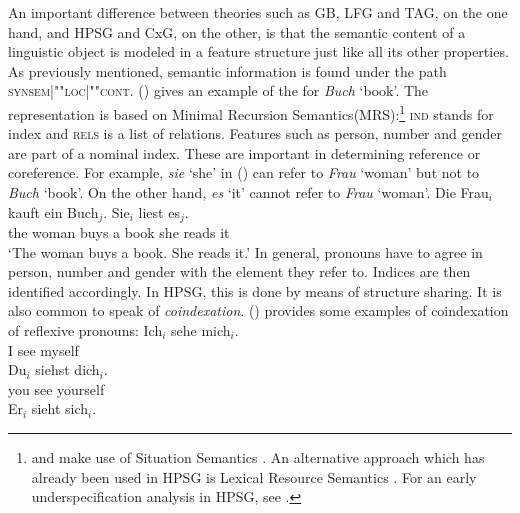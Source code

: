 An important difference between theories such as GB, LFG and TAG, on the one hand, and HPSG and CxG, on the other, is that the semantic content of a linguistic
object is modeled in a feature structure just like all its other properties. As previously mentioned, semantic information is found under the path
\textsc{synsem|""loc|""cont}. () gives an example of the \contv for \emph{Buch} `book'. The
representation is based on Minimal Recursion Semantics\indexmrs (MRS):\footnote{%
   \citet{ps2} and \citet{GSag2000a-u} make use of Situation Semantics \citep*{BP83a,CMP90,Devlin92}\nocite{BP87a}.
   An alternative approach which has already been used in HPSG is Lexical Resource Semantics \citep{RS2004a-u}.
   For an early underspecification analysis in HPSG, see .
}
\ea
\label{le-buch}
\z
\textsc{ind} stands for index and \textsc{rels} is a list of relations. Features such as person, number and
gender are part of a nominal index. These are important
in determining reference or coreference.
For example, \emph{sie} `she' in () can refer to \emph{Frau} `woman' but not to \emph{Buch} `book'. On the other hand, \emph{es} 
`it' cannot refer to \emph{Frau} `woman'.
\ea
\gll Die Frau$_i$ kauft ein Buch$_j$. Sie$_i$ liest es$_j$.\\
	 the woman buys a book she reads it\\
\glt `The woman buys a book. She reads it.'
\z
In general, pronouns have to agree in person, number and gender with the element they refer to. Indices are then identified accordingly.
In HPSG, this is done by means of structure sharing. It is also common to speak of \textit{coindexation}.
() provides some examples of coindexation of reflexive pronouns:
\eal
\ex
\gll Ich$_i$ sehe mich$_i$.\\
     I see myself\\
\ex 
\gll Du$_i$ siehst dich$_i$.\\
     you see yourself\\
\ex 
\gll Er$_i$ sieht sich$_i$.\\
